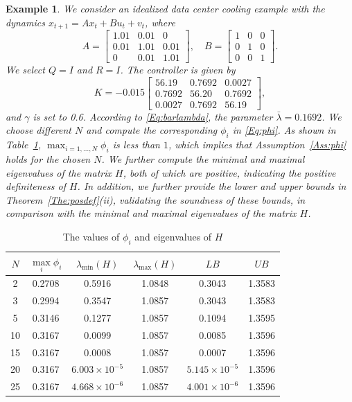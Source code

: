\documentclass[letterpaper, 10 pt, conference]{ieeeconf}  %
\newtheorem{example}{Example}[section]
\begin{document}
\begin{example}\label{Exam:exam1}
    We consider an idealized data center cooling example \cite{dean2020sample,9691800} with the dynamics $x_{t+1}=Ax_t+Bu_t+v_t$, where 
    \[
A = \begin{bmatrix}
1.01 & 0.01 & 0 \\
0.01 & 1.01 & 0.01 \\
0    & 0.01 & 1.01
\end{bmatrix}, \quad
B = \begin{bmatrix}
1 & 0 & 0 \\
0 & 1 & 0 \\
0 & 0 & 1
\end{bmatrix}.
\]
We select $Q=I$ and $R=I$.
The controller is given by
\[
K = -0.015
\begin{bmatrix}
56.19 & 0.7692 & 0.0027 \\
0.7692 & 56.20 & 0.7692 \\
0.0027 & 0.7692 & 56.19
\end{bmatrix},
\]
and $\gamma$ is set to 0.6.  %
According to \eqref{Eq:barlambda},  the parameter $\bar{\lambda}=0.1692$. 
We choose different $N$ and compute the corresponding $\phi_i$ in \eqref{Eq:phi}. As shown in Table~\ref{Table:example1}, $\max_{i=1,\ldots,N} \phi_i$ is less than $1$, which implies that Assumption~\ref{Ass:phi} holds for the chosen $N$. We further compute the minimal and maximal eigenvalues of the matrix $H$, both of which are positive, indicating the positive definiteness of $H$. In addition, we further provide the lower and upper bounds in Theorem~\ref{The:posdef}(ii), validating the soundness of these bounds, in comparison with the minimal and maximal eigenvalues of the matrix $H$. 
\end{example}

\begin{table}[htbp]
  \centering
  \caption{The values of $\phi_i$ and eigenvalues of $H$}
  \label{tab:example}
  \begin{tabular}{cccccc}
    \toprule
    $N$   &$\max\limits_{i} \phi_i$ & $\lambda_{\min}(H)$    & $\lambda_{\max}(H)$   & $LB$  & $UB$\\
    \midrule
    2 & 0.2708 & 0.5916 &  1.0848 & 0.3043 &1.3583 \\
    3 & 0.2994 & 0.3547 &  1.0857 & 0.3043 &1.3583 \\5&
    0.3146 & 0.1277 & 1.0857 & 0.1094 &1.3595  \\
    10 & 0.3167 & 0.0099 & 1.0857&0.0085&1.3596 \\
    15 & 0.3167 & 0.0008 & 1.0857&0.0007 &1.3596
 \\
    20 & 0.3167 & 
$6.003 \times 10^{-5}$
 & 1.0857&$5.145 \times 10^{-5}$& 1.3596\\
    25 & 0.3167 & $4.668 \times 10^{-6}$ & 1.0857&$4.001 \times 10^{-6}$& 1.3596\\
    \bottomrule
  \end{tabular}\label{Table:example1}
\end{table}
\end{document}
